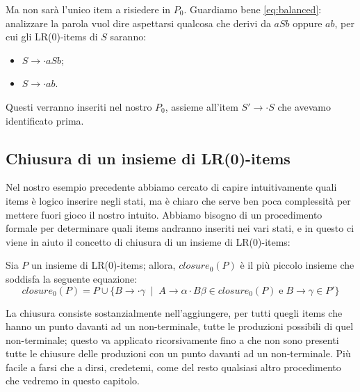 \documentclass[class=book, crop=false, oneside, 12pt]{standalone}
\begin{document}
Ma non sarà l'unico item a risiedere in \(P_0\).  Guardiamo bene \ref{eq:balanced}: analizzare la parola vuol dire aspettarsi qualcosa che derivi da \(aSb\) oppure \(ab\), per cui gli LR(0)-items di \(S\) saranno:
\begin{itemize}
    \item \(S \to \cdot aSb\);
    \item \(S \to \cdot ab\).
\end{itemize}
Questi verranno inseriti nel nostro \(P_0\), assieme all'item \(S' \to \cdot S\) che avevamo identificato prima. 

\subsection{Chiusura di un insieme di LR(0)-items}
Nel nostro esempio precedente abbiamo cercato di capire intuitivamente quali items è logico inserire negli stati, ma è chiaro che serve ben poca complessità per mettere fuori gioco il nostro intuito. Abbiamo bisogno di un procedimento formale per determinare quali items andranno inseriti nei vari stati, e in questo ci viene in aiuto il concetto di chiusura di un insieme di LR(0)-items:

\begin{definition}
    Sia \(P\) un insieme di LR(0)-items; allora, \(closure_0(P)\) è il più piccolo insieme che soddisfa la seguente equazione:
    \begin{equation}
        closure_0(P) = P \cup \{B \to \cdot \gamma \; \mid \; A \to \alpha \cdot B \beta \in closure_0(P) \; \textrm{e} \; B \to \gamma \in P'\}
    \end{equation}
\end{definition}

La chiusura consiste sostanzialmente nell'aggiungere, per tutti quegli items che hanno un punto davanti ad un non-terminale, tutte le produzioni possibili di quel non-terminale; questo va applicato ricorsivamente fino a che non sono presenti tutte le chiusure delle produzioni con un punto davanti ad un non-terminale. Più facile a farsi che a dirsi, credetemi, come del resto qualsiasi altro procedimento che vedremo in questo capitolo.
\end{document}

